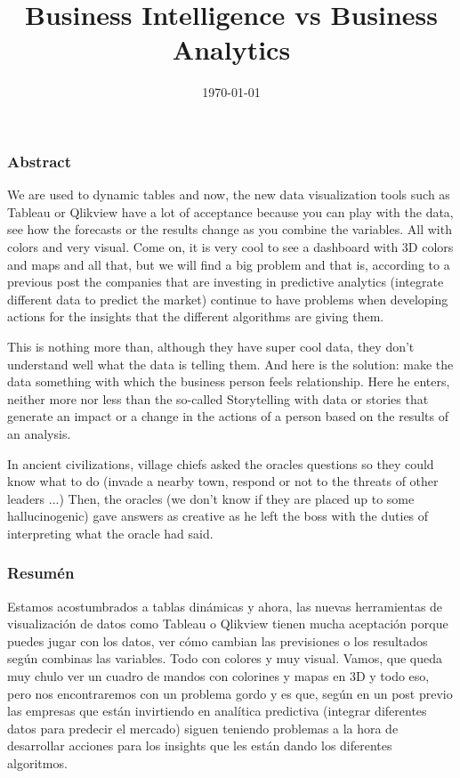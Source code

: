 \documentclass[a4paper,12pt,twocolumn]{article}
\title{Business Intelligence vs Business Analytics}
\date{\today}
\begin{document}
\maketitle
\subsubsection*{Abstract}
We are used to dynamic tables and now, the new data visualization tools such as Tableau or Qlikview have a lot of acceptance because you can play with the data, see how the forecasts or the results change as you combine the variables. All with colors and very visual. Come on, it is very cool to see a dashboard with 3D colors and maps and all that, but we will find a big problem and that is, according to a previous post the companies that are investing in predictive analytics (integrate different data to predict the market) continue to have problems when developing actions for the insights that the different algorithms are giving them.

This is nothing more than, although they have super cool data, they don't understand well what the data is telling them. And here is the solution: make the data something with which the business person feels relationship. Here he enters, neither more nor less than the so-called Storytelling with data or stories that generate an impact or a change in the actions of a person based on the results of an analysis.

In ancient civilizations, village chiefs asked the oracles questions so they could know what to do (invade a nearby town, respond or not to the threats of other leaders ...) Then, the oracles (we don't know if they are placed up to some hallucinogenic) gave answers as creative as he left the boss with the duties of interpreting what the oracle had said.
\subsubsection*{Resumén}
Estamos acostumbrados a tablas dinámicas y  ahora, las nuevas herramientas de visualización de datos como Tableau o Qlikview tienen mucha aceptación porque puedes jugar con los datos, ver cómo cambian las previsiones o los resultados según combinas las variables. Todo con colores y muy visual. Vamos, que queda muy chulo ver un cuadro de mandos con colorines y mapas en 3D y todo eso, pero nos encontraremos con un problema gordo y es que, según en un post previo las empresas que están invirtiendo en analítica predictiva (integrar diferentes datos para predecir el mercado) siguen teniendo problemas a la hora de desarrollar acciones para los insights que les están dando los diferentes algoritmos.
\end{document}
